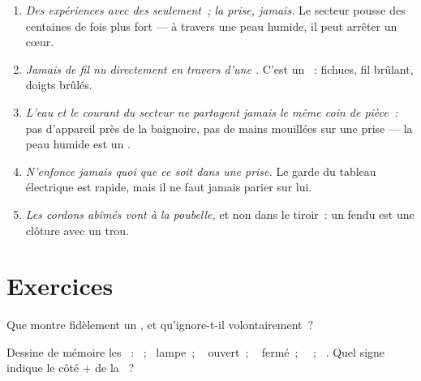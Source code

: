 \begin{remark}\label{rem:g6:circuits-and-safety:rules}
\begin{enumerate}
  \item \emph{Des expériences avec des  seulement~; la prise,
        jamais.} Le secteur pousse des centaines de fois plus
        fort --- à travers une peau humide, il peut arrêter un
        cœur.
  \item \emph{Jamais de fil nu directement en travers d'une .}
        C'est un ~:  fichues, fil brûlant, doigts
        brûlés.
  \item \emph{L'eau et le courant du secteur ne partagent jamais le
        même coin de pièce~:} pas d'appareil près de la baignoire,
        pas de mains mouillées sur une prise --- la peau humide est
        un .
  \item \emph{N'enfonce jamais quoi que ce soit dans une prise.} Le
        garde du tableau électrique est rapide, mais il ne faut
        jamais parier sur lui.
  \item \emph{Les cordons abîmés vont à la poubelle,} et non dans
        le tiroir~: un  fendu est une clôture avec un trou.
\end{enumerate}
\end{remark}

\section{Exercices}

\begin{exercise}[$\star$]\label{exo:g6:circuits-and-safety:1}
Que montre fidèlement un , et qu'ignore-t-il
volontairement~?
\end{exercise}

\begin{exercise}[$\star$]\label{exo:g6:circuits-and-safety:2}
Dessine de mémoire les ~: ~; \ lampe~; \ 
ouvert~; \  fermé~; \ ~; \ . Quel signe
indique le côté $+$ de la ~?
\end{exercise}

